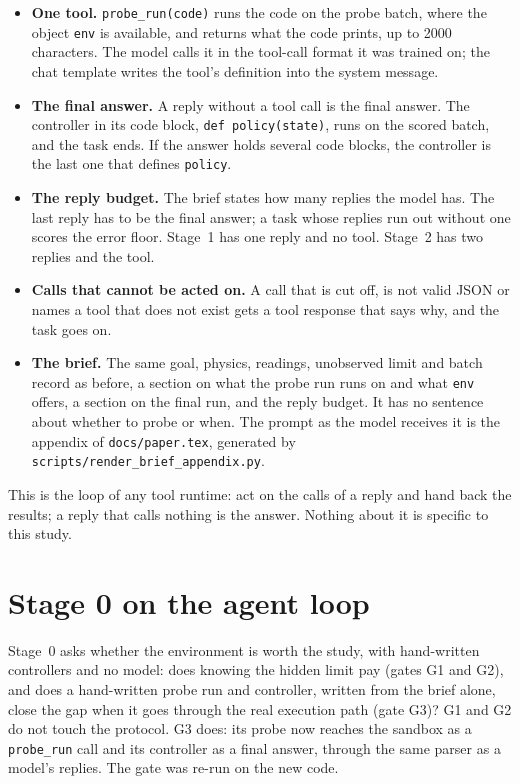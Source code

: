 \documentclass[11pt,a4paper]{article}
\begin{document}
\begin{itemize}[leftmargin=1.5em]
  \item \textbf{One tool.} \texttt{probe\_run(code)} runs the code on the
  probe batch, where the object \texttt{env} is available, and returns what
  the code prints, up to 2000 characters. The model calls it in the
  tool-call format it was trained on; the chat template writes the tool's
  definition into the system message.
  \item \textbf{The final answer.} A reply without a tool call is the final
  answer. The controller in its code block, \texttt{def policy(state)}, runs
  on the scored batch, and the task ends. If the answer holds several code
  blocks, the controller is the last one that defines \texttt{policy}.
  \item \textbf{The reply budget.} The brief states how many replies the
  model has. The last reply has to be the final answer; a task whose replies
  run out without one scores the error floor. Stage~1 has one reply and no
  tool. Stage~2 has two replies and the tool.
  \item \textbf{Calls that cannot be acted on.} A call that is cut off, is not
  valid JSON or names a tool that does not exist gets a tool response that
  says why, and the task goes on.
  \item \textbf{The brief.} The same goal, physics, readings, unobserved
  limit and batch record as before, a section on what the probe run runs on
  and what \texttt{env} offers, a section on the final run, and the reply
  budget. It has no sentence about whether to probe or when. The prompt as
  the model receives it is the appendix of \texttt{docs/paper.tex}, generated
  by \texttt{scripts/render\_brief\_appendix.py}.
\end{itemize}

This is the loop of any tool runtime: act on the calls of a reply and hand
back the results; a reply that calls nothing is the answer. Nothing about it
is specific to this study.

\section{Stage 0 on the agent loop}
\label{sec:stage0}

Stage~0 asks whether the environment is worth the study, with hand-written
controllers and no model: does knowing the hidden limit pay (gates G1 and
G2), and does a hand-written probe run and controller, written from the
brief alone, close the gap when it goes through the real execution path
(gate G3)? G1 and G2 do not touch the protocol. G3 does: its probe now
reaches the sandbox as a \texttt{probe\_run} call and its controller as a
final answer, through the same parser as a model's replies. The gate was
re-run on the new code.
\end{document}
